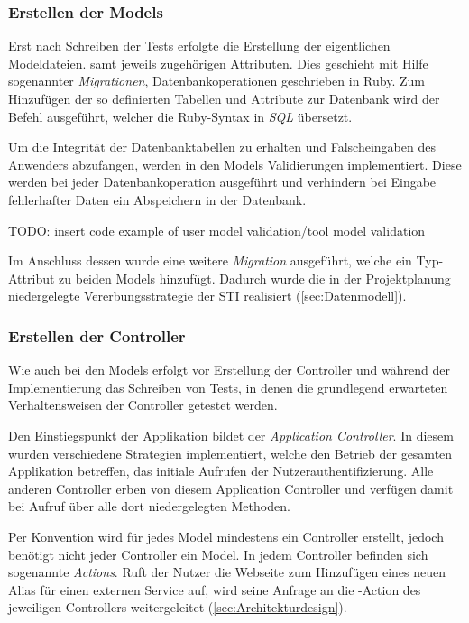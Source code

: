 \subsubsection{Erstellen der Models}
\label{sec:Erstellen der Models}
Erst nach Schreiben der Tests erfolgte die Erstellung der eigentlichen Modeldateien. samt jeweils
zugehörigen Attributen. Dies geschieht mit Hilfe sogenannter \textit{Migrationen},
Datenbankoperationen geschrieben in Ruby. Zum Hinzufügen der so definierten Tabellen und Attribute
zur Datenbank wird der Befehl  ausgeführt, welcher die Ruby-Syntax in
\textit{\acs{SQL}} übersetzt.

Um die Integrität der Datenbanktabellen zu erhalten und \ggfs Falscheingaben des Anwenders abzufangen,
werden in den Models Validierungen implementiert. Diese werden bei jeder Datenbankoperation
ausgeführt und verhindern bei Eingabe fehlerhafter Daten ein Abspeichern in der Datenbank.

TODO: insert code example of user model validation/tool model validation

Im Anschluss dessen wurde eine weitere \textit{Migration} ausgeführt, welche ein Typ-Attribut zu
beiden Models hinzufügt. Dadurch wurde die in der Projektplanung niedergelegte Vererbungsstrategie
der \acs{STI} realisiert (\Vgl \ref{sec:Datenmodell}).

\subsubsection{Erstellen der Controller}
\label{sec:Erstellen der Controller}
Wie auch bei den Models erfolgt vor Erstellung der Controller und während der Implementierung
das Schreiben von Tests, in denen die grundlegend erwarteten Verhaltensweisen der Controller
getestet werden.

Den Einstiegspunkt der Applikation bildet der \textit{Application Controller}. In diesem wurden
verschiedene Strategien implementiert, welche den Betrieb der gesamten Applikation betreffen,
\bspw das initiale Aufrufen der Nutzerauthentifizierung. Alle anderen Controller erben von diesem
Application Controller und verfügen damit bei Aufruf über alle dort niedergelegten Methoden.

Per Konvention wird für jedes Model mindestens ein Controller erstellt, jedoch benötigt nicht jeder
Controller ein Model. In jedem Controller befinden sich sogenannte \textit{Actions}. Ruft der Nutzer
\bspw die Webseite zum Hinzufügen eines neuen Alias für einen externen Service auf, wird seine
Anfrage an die -Action des jeweiligen Controllers weitergeleitet
(\Vgl \ref{sec:Architekturdesign}).

